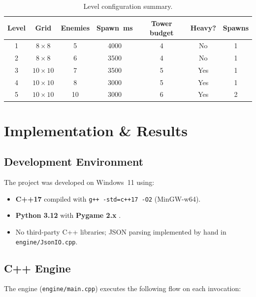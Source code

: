 \documentclass[12pt,a4paper]{report}
\begin{document}
\begin{table}[ht]
\centering
\caption{Level configuration summary.}
\label{tab:levels}
\begin{tabular}{ccccccc}
\toprule
\textbf{Level} & \textbf{Grid} & \textbf{Enemies} & \textbf{Spawn~ms}
  & \textbf{Tower budget} & \textbf{Heavy?} & \textbf{Spawns} \\
\midrule
1 &  $8\!\times\!8$  &  5 & 4000 & 4 & No  & 1 \\
2 &  $8\!\times\!8$  &  6 & 3500 & 4 & No  & 1 \\
3 & $10\!\times\!10$ &  7 & 3500 & 5 & Yes & 1 \\
4 & $10\!\times\!10$ &  8 & 3000 & 5 & Yes & 1 \\
5 & $10\!\times\!10$ & 10 & 3000 & 6 & Yes & 2 \\
\bottomrule
\end{tabular}
\end{table}

\chapter{Implementation \& Results}
\label{ch:implementation}

\section{Development Environment}

The project was developed on Windows~11 using:
\begin{itemize}
  \item \textbf{C++17} compiled with \texttt{g++ -std=c++17 -O2} (MinGW-w64).
  \item \textbf{Python 3.12} with \textbf{Pygame 2.x} \cite{pygame2024docs}.
  \item No third-party C++ libraries; JSON parsing implemented by hand in
        \texttt{engine/JsonIO.cpp}.
\end{itemize}

\section{C++ Engine}

The engine (\texttt{engine/main.cpp}) executes the following flow on each
invocation:
\end{document}
